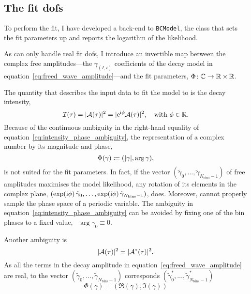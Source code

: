 \subsection{The fit \acp{dof}}

    To perform the fit, I have developed a back-end to \lstinline!BCModel!, the  class that sets the fit parameters up and reports the logarithm of the likelihood.


    As  can only handle real fit \acp{dof}, I introduce an invertible map between the complex free amplitudes---the $\gamma_{(I,i)}$ coefficients of the decay model in equation~\eqref{eq:freed_wave_amplitude}---and the fit parameters, $\Phi\colon \mathbb{C}\to\mathbb{R}\times\mathbb{R}$.


    The quantity that describes the input data to fit the model to is the decay intensity,
    \begin{equation}\label{eq:intensity_phase_ambiguity}
        \mathcal{I}(\tau) = \lvert\mathcal{A}(\tau)\rvert^2 = \lvert\mathrm{e}^{\mathrm{i}\phi}\mathcal{A}(\tau)\rvert^2,
        \quad
        \text{with }
        \phi\in\mathbb{R}.
    \end{equation}
    Because of the continuous ambiguity in the right-hand equality of equation~\eqref{eq:intensity_phase_ambiguity}, the representation of a complex number by its magnitude and phase,
    \begin{equation}
        \Phi(\gamma) \coloneqq (\lvert\gamma\rvert, \arg\gamma),
    \end{equation}
    is not suited for the fit parameters.
    In fact, if the vector $(\tilde \gamma_0, \dots, \tilde \gamma_{N_\text{bins}-1})$ of free amplitudes maximises the model likelihood, any rotation of its elements in the complex plane, $(\exp(\mathrm{i}\phi)\,\tilde \gamma_0, \dots, \exp(\mathrm{i}\phi)\,\tilde \gamma_{N_\text{bins}-1})$, does.
    Moreover,  cannot properly sample the phase space of a periodic variable.
    The ambiguity in equation~\eqref{eq:intensity_phase_ambiguity} can be avoided by fixing one of the bin phases to a fixed value, \eg~$\arg \gamma_0 \equiv 0$.


    Another ambiguity is
    \begin{equation}\label{eq:intensity_conjugate_ambiguity}
        \lvert\mathcal{A}(\tau)\rvert^2 = \lvert\mathcal{A}^*(\tau)\rvert^2.
    \end{equation}
    As all the terms in the decay amplitude in equation~\eqref{eq:freed_wave_amplitude} are real, to the vector $(\tilde \gamma_0, \dots, \tilde \gamma_{N_\text{bins}-1})$ corresponds $(\tilde \gamma_0^*, \dots, \tilde \gamma_{N_\text{bins}-1}^*)$
    \begin{equation}
        \Phi(\gamma) = (\Re(\gamma), \Im(\gamma))
    \end{equation}

